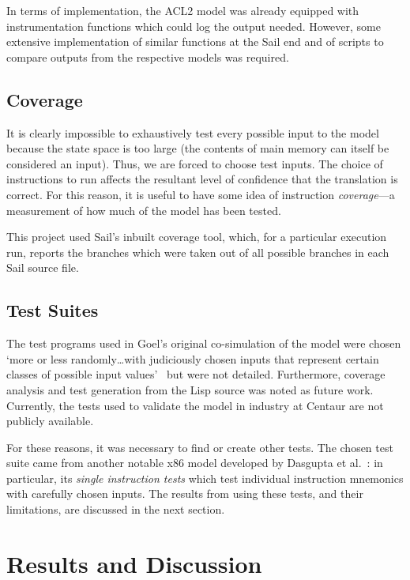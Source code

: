 \documentclass[a4paper,12pt,twoside,openright]{report}
\begin{document}
In terms of implementation, the ACL2 model was already equipped with instrumentation functions which could log the output needed.  However, some extensive implementation of similar functions at the Sail end and of scripts to compare outputs from the respective models was required.

\hypertarget{methodology-coverage}{
\subsection{Coverage}\label{methodology-coverage}}

It is clearly impossible to exhaustively test every possible input to the model because the state space is too large (the contents of main memory can itself be considered an input).  Thus, we are forced to choose test inputs.  The choice of instructions to run affects the resultant level of confidence that the translation is correct.  For this reason, it is useful to have some idea of instruction \emph{coverage}---a measurement of how much of the model has been tested.

This project used Sail's inbuilt coverage tool, which, for a particular execution run, reports the branches which were taken out of all possible branches in each Sail source file.

\hypertarget{methodology-test-suite}{
\subsection{Test Suites}\label{methodology-test-suite}}

The test programs used in Goel's original co-simulation of the model were chosen `more or less randomly\ldots with judiciously chosen inputs that represent certain classes of possible input values'~\cite{goel-thesis} but were not detailed.  Furthermore, coverage analysis and test generation from the Lisp source was noted as future work.  Currently, the tests used to validate the model in industry at Centaur are not publicly available.

For these reasons, it was necessary to find or create other tests.  The chosen test suite came from another notable x86 model developed by Dasgupta et al.~\cite{k-framework-tests}: in particular, its \emph{single instruction tests} which test individual instruction mnemonics with carefully chosen inputs.  The results from using these tests, and their limitations, are discussed in the next section.

\section{Results and Discussion}
\end{document}
